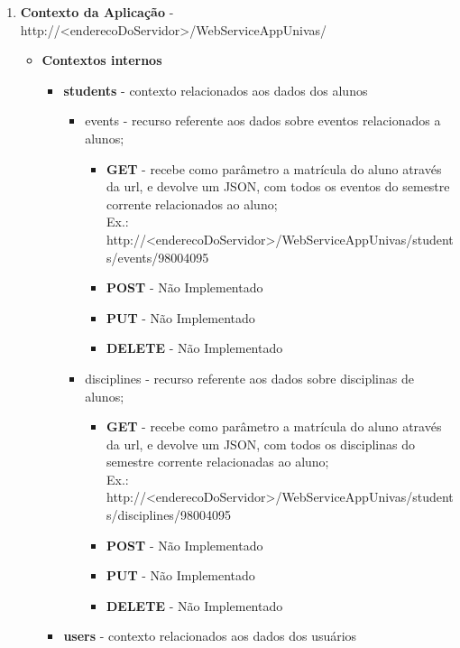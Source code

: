 \begin{tiny}
\begin{enumerate}
	\item \textbf{Contexto da Aplicação} -
	http://<enderecoDoServidor>/WebServiceAppUnivas/
		\begin{itemize}
			\item \textbf{Contextos internos}
				\begin{itemize}
					\item \textbf{students} - contexto relacionados aos dados dos alunos
							\begin{itemize}
								
								\item events - recurso referente aos dados sobre eventos relacionados a
								alunos;
									\begin{itemize}
									  \item \textbf{GET} - recebe como parâmetro a matrícula do aluno
									  através da url, e devolve um JSON, com todos os eventos do semestre corrente
									  relacionados ao aluno;\\ Ex.: 
									  http://<enderecoDoServidor>/WebServiceAppUnivas/students/events/98004095
									  \item \textbf{POST} - Não Implementado
									  \item \textbf{PUT} - Não Implementado
									  \item \textbf{DELETE} - Não Implementado
									\end{itemize}									
								\item disciplines - recurso referente aos dados sobre disciplinas de
								alunos;
									\begin{itemize}
									  \item \textbf{GET} - recebe como parâmetro a matrícula do aluno
									  através da url, e devolve um JSON, com todos os disciplinas do semestre
									  corrente relacionadas ao aluno;\\ Ex.: 
									  http://<enderecoDoServidor>/WebServiceAppUnivas/students/disciplines/98004095
									  \item \textbf{POST} - Não Implementado
									  \item \textbf{PUT} - Não Implementado
									  \item \textbf{DELETE} - Não Implementado
									\end{itemize}
							\end{itemize}
					\item \textbf{users} - contexto relacionados aos dados dos usuários

\end{itemize}
\end{itemize}
\end{enumerate}
\end{tiny}
